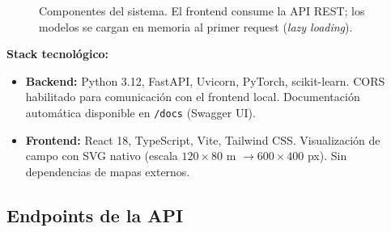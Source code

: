 \documentclass[12pt,a4paper]{article}
\newcommand{\code}[1]{\texttt{\small #1}}
\begin{document}
\begin{figure}[H]
\centering
{}
\caption{Componentes del sistema. El frontend consume la API REST; los modelos se
         cargan en memoria al primer request (\textit{lazy loading}).}
\label{fig:arch_system}
\end{figure}

\textbf{Stack tecnológico:}
\begin{itemize}[leftmargin=1.5em, noitemsep]
    \item \textbf{Backend:} Python 3.12, FastAPI, Uvicorn, PyTorch, scikit-learn.
          CORS habilitado para comunicación con el frontend local.
          Documentación automática disponible en \code{/docs} (Swagger UI).
    \item \textbf{Frontend:} React 18, TypeScript, Vite, Tailwind CSS.
          Visualización de campo con SVG nativo (escala $120 \times 80$ m
          $\to 600 \times 400$ px). Sin dependencias de mapas externos.
\end{itemize}

\subsection{Endpoints de la API}
\end{document}
